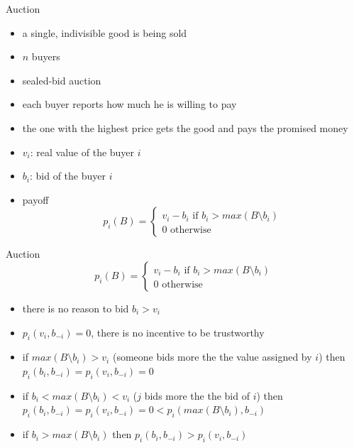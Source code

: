 \documentclass{beamer}
\begin{document}
\begin{frame}{Auction}
  \begin{itemize}
    \item a single, indivisible good is being sold
    \item $n$ buyers
    \item sealed-bid auction
    \item each buyer reports how much he is willing to pay
    \item<2-> the one with the highest price gets the good and pays
      the promised money
    \item<3-> $v_i$: real value of the buyer $i$
    \item<4-> $b_i$: bid of the buyer $i$
    \item<5-> payoff
\[
p_i(B) = \left \{
  \begin{array}{l}
    v_i - b_i \mbox{ if } b_i > max(B \setminus b_i)\\
    0         \mbox{ otherwise }
  \end{array}
\right .
\]
  \end{itemize}
\end{frame}


\begin{frame}{Auction}
\[
p_i(B) = \left \{
  \begin{array}{l}
    v_i - b_i \mbox{ if } b_i > max(B \setminus b_i)\\
    0         \mbox{ otherwise }
  \end{array}
\right .
\]
  \begin{itemize}
    \item there is no reason to bid $b_i > v_i$
    \item<2-> $p_i(v_i, b_{-i}) = 0$, there is no incentive to be trustworthy
    \item<3-> if $max(B \setminus b_i) > v_i$ (someone bids more the the value assigned by $i$) then 
      $p_i(b_i, b_{-i}) = p_i(v_i, b_{-i}) = 0$
    \item<4-> if $b_i < max(B \setminus b_i) < v_i$ ($j$ bids more the
      the bid of $i$) then 
      $p_i(b_i, b_{-i}) =  p_i(v_i, b_{-i}) = 0 < p_i(max(B \setminus
      b_i), b_{-i})$
    \item<5-> if $b_i > max(B \setminus b_i)$  then 
      $p_i(b_i, b_{-i}) >  p_i(v_i, b_{-i})$
  \end{itemize}
\end{frame}
\end{document}
